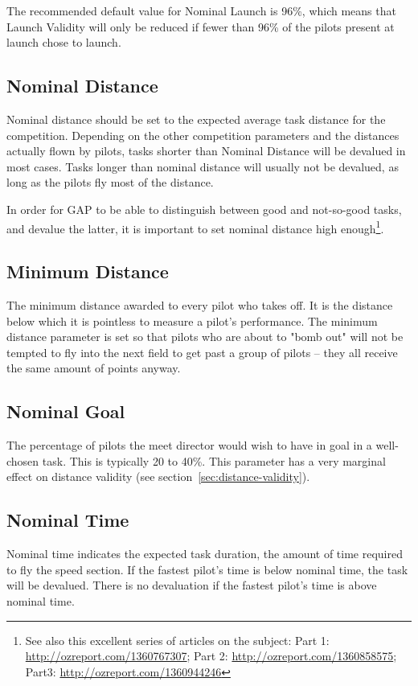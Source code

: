 \documentclass{article}
\begin{document}
The recommended default value for Nominal Launch is 96\%, which means that
Launch Validity will only be reduced if fewer than 96\% of the pilots present at
launch chose to launch.

\subsection{Nominal Distance}
Nominal distance should be set to the expected average task distance for the
competition. Depending on the other competition parameters and the distances
actually flown by pilots, tasks shorter than Nominal Distance will be devalued
in most cases. Tasks longer than nominal distance will usually not be devalued,
as long as the pilots fly most of the distance.

In order for GAP to be able to distinguish between good and not-so-good tasks,
and devalue the latter, it is important to set nominal distance high
enough\footnote{See also this excellent series of articles on the subject: Part
1: \url{http://ozreport.com/1360767307}; Part 2:
\url{http://ozreport.com/1360858575}; Part3:
\url{http://ozreport.com/1360944246}}.  

\subsection{Minimum Distance}
The minimum distance awarded to every pilot who takes off. It is the distance
below which it is pointless to measure a pilot's performance. The minimum
distance parameter is set so that pilots who are about to "bomb out" will not
be tempted to fly into the next field to get past a group of pilots – they all
receive the same amount of points anyway.

\subsection{Nominal Goal}
The percentage of pilots the meet director would wish to have in goal in
a well-chosen task. This is typically 20 to 40\%. This parameter has a very
marginal effect on distance validity (see section~\ref{sec:distance-validity}).

\subsection{Nominal Time}
Nominal time indicates the expected task duration, the amount of time required
to fly the speed section. If the fastest pilot’s time is below nominal time,
the task will be devalued. There is no devaluation if the fastest pilot’s time
is above nominal time.
\end{document}
